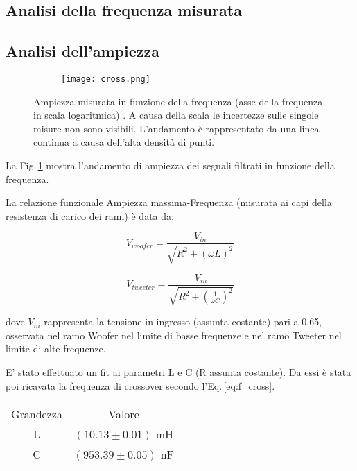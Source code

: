 \documentclass[../Relazione_circuiti]{subfiles}
\begin{document}
\subsection{Analisi della frequenza misurata}

\subsection{Analisi dell'ampiezza}

  \begin{figure}[H]
    \centering

    \begin{subfigure}{=0.7\textwidth}

      \texttt{[image: cross.png]}

    \end{subfigure}

    \caption{Ampiezza misurata in funzione della frequenza (asse della frequenza in scala logaritmica)
      . A causa della scala le incertezze sulle singole misure non sono visibili. L'andamento è rappresentato da una
      linea continua a causa dell'alta densità di punti.}
    \label{fig: cross_amplitude}

  \end{figure}

  La Fig.\,\ref{fig: cross_amplitude} mostra l'andamento di ampiezza dei segnali filtrati in funzione della frequenza.

  La relazione funzionale Ampiezza massima-Frequenza (misurata ai capi della resistenza di carico dei rami) è data da:

  \begin{equation}
    V_{woofer} = \frac{V_{in}}{\sqrt{R^2+(\omega L)^2}}
  \end{equation}

  \begin{equation}
    V_{tweeter} = \frac{V_{in}}{\sqrt{R^2+(\frac{1}{\omega C})^2}}
  \end{equation}

  dove $V_{in}$
      rappresenta la tensione in ingresso (assunta costante) pari a 0.65, osservata nel ramo Woofer nel limite di basse
      frequenze e nel ramo Tweeter nel limite di alte frequenze.

      E' stato effettuato un fit ai parametri L e C (R assunta costante). Da essi è stata poi ricavata la frequenza di
      crossover secondo l'Eq.\,\eqref{eq:f_cross}.

  \begin{tabular}{c | c }

    Grandezza & Valore                 \\

    L         & $(10.13 \pm 0.01)$ mH  \\
    C         & $(953.39 \pm 0.05)$ nF

  \end{tabular}
\end{document}
